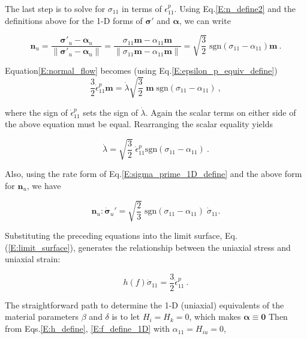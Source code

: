 \documentclass[11pt]{report}
\numberwithin{equation}{section}
\newcommand{\bmf } {\boldsymbol }
\begin{document}
The last step is to solve for $\sigma_{11}$ in terms of $\epsilon^p_{11}$. Using 
Eq.\;\eqref{E:n_define2} and the definitions above for the 1-D forms of $\bmf \sigma'$
and $\bmf \alpha$, we can write


\begin{equation}\label{E:n_u_define}
\bmf n_u = \frac{\bmf \sigma'_u - \bmf \alpha_u} 
{\parallel \bmf \sigma'_u - \bmf \alpha_u \parallel }
=
\frac {\sigma_{11} \bmf m - \alpha_{11} \bmf m }{\parallel \sigma_{11} 
\bmf m - \alpha_{11} \bmf m 
\parallel }
= \sqrt{\textstyle{\frac{3}{2}}}\;
\text{sgn} \left(\sigma_{11} -\alpha_{11} \right) \bmf m~.
\end{equation}

\noindent Equation\;\eqref{E:normal_flow} becomes 
(using Eq.\;\eqref{E:epsilon_p_equiv_define})
\begin{equation}
\textstyle{\frac{3}{2}}\dot\epsilon^p_{11}\bmf{m}=
\dot{\lambda}\sqrt{\frac{3}{2}}\;\bmf{m}\;
 \text{sgn} \left(\sigma_{11} -\alpha_{11} \right) ~,
\end{equation}

\noindent where the sign of $\dot \epsilon^p_{11}$ sets the sign of
$\dot \lambda$. Again the scalar terms on either side of the above 
equation must be equal. Rearranging the scalar equality yields

\begin{equation}\label{E:dot_lambda_u_defined}
\dot{\lambda}=\sqrt{\textstyle{\frac{3}{2}}}\;\dot\epsilon^p_{11}
\text{sgn} \left(\sigma_{11} -\alpha_{11} \right) ~.
\end{equation}

\noindent Also, using the rate form of Eq.\;\eqref{E:sigma_prime_1D_define} 
and the above form for $\bmf n_u$, we have

\begin{equation}
\bmf n_u:\dot{\bmf \sigma}_u'=\sqrt{\textstyle{\frac{2}{3}}}\;
\text{sgn}(\sigma_{11} - \alpha_{11})\;\dot\sigma_{11}.
\end{equation}


Substituting the preceding equations into the limit surface,
Eq. (\ref{E:limit_surface}), generates the relationship between the 
uniaxial stress and uniaxial strain: 

\begin{equation}
h(f)\dot\sigma_{11}=\textstyle{\frac{3}{2}}\dot\epsilon^p_{11}~.
\end{equation}

\noindent The straightforward path to determine the 1-D (uniaxial) equivalents 
of the material parameters $\beta$ and $\delta$ is to let $H_i=H_k=0$, which
makes $\bmf \alpha \equiv \bmf 0$  Then from Eqs.\;\eqref{E:h_define}, \eqref{E:f_define_1D}
with $\alpha_{11} = H_{iu} = 0$,
\end{document}

